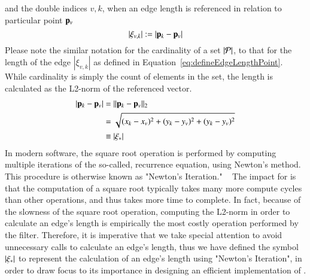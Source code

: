 and the double indices $v,k$, when an edge length is referenced in relation to particular point $\mathbf{p}_v$
\begin{equation}
	|\xi_{v,k}| := |\mathbf{p}_k - \mathbf{p}_v|
	\label{eq:defineEdgeLengthPoint}
\end{equation}%
%
Please note the similar notation for the cardinality of a set $|\mathcal{P}|$, to that for the length of the edge $|\xi_{v,k}|$ as defined in Equation~\ref{eq:defineEdgeLengthPoint}. While cardinality is simply the count of elements in the set, the length is calculated as the L2-norm of the referenced vector.~\cite[p.~26]{Mara12}
\begin{equation}
\begin{aligned}
	|\mathbf{p}_k - \mathbf{p}_v| & = \lVert\mathbf{p}_k - \mathbf{p}_v\rVert_2 \\
					& = \sqrt{(x_k-x_v)^2 + (y_k-y_v)^2 + (y_k-y_v)^2} \\
					& \equiv \left |\xi_\ast \right |
	\label{eq:defineEdgeLengthCalc}
\end{aligned}
\end{equation}
%
In modern software, the square root operation is performed by computing multiple iterations of the so-called, recurrence equation, using Newton's method. This procedure is otherwise known as "Newton's Iteration." ~\cite{Weisstein19b} The impact for  is that the computation of a square root typically takes many more compute cycles than other operations, and thus takes more time to complete. In fact, because of the slowness of the square root operation, computing the L2-norm in order to calculate an edge's length is empirically the most costly operation performed by the filter. Therefore, it is imperative that we take special attention to avoid unnecessary calls to calculate an edge's length, thus we have defined the symbol $\left |\xi_\ast \right |$ to represent the calculation of an edge's length using "Newton's Iteration", in order to draw focus to its importance  in designing an efficient implementation of .%
%
%
